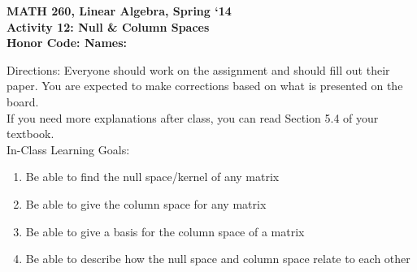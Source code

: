 \documentclass{article}
\begin{document}
\begin{flushleft}
	\bfseries{MATH 260, Linear Algebra, Spring `14}\\
	\bfseries{Activity 12:  Null \& Column Spaces}\\
	\bfseries{Honor Code:} \hspace{3.5in}\bfseries{Names:}\\
\end{flushleft}
\begin{flushleft}
\vspace{.75in}
Directions:  Everyone should work on the assignment and should fill out their paper.  You are expected to make corrections based on what is presented on the board.  \\
If you need more explanations after class, you can read Section 5.4 of your textbook.\\
\vspace{0.1in}
\Large
In-Class Learning Goals:\\
\normalsize
\begin{enumerate}
\item Be able to find the null space/kernel of any matrix
\item Be able to give the column space for any matrix
\item Be able to give a basis for the column space of a matrix
\item Be able to describe how the null space and column space relate to each other

\end{enumerate}

\vspace{0.1in}


\end{flushleft}
\end{document}
